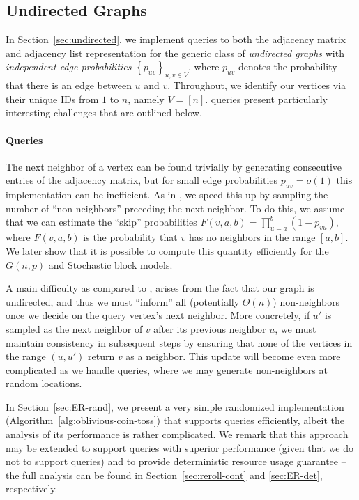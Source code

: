 \subsection{Undirected Graphs}
\label{sec:undirected_graphs}
In Section~\ref{sec:undirected}, we implement queries to both the adjacency matrix and adjacency list representation
for the generic class of \emph{undirected graphs} with {\em independent edge probabilities} $\left\{ p_{uv} \right\}_{u,v\in V}$,
where $p_{uv}$ denotes the probability that there is an edge between $u$ and $v$.
Throughout, we identify our vertices via their unique IDs from $1$ to $n$, namely $V = [n]$.
 queries present particularly interesting challenges that are outlined below.

\paragraph*{ Queries}
\label{par:next_neighbor_queries}
The next neighbor of a vertex can be found trivially by generating consecutive entries of the adjacency matrix,
but for small edge probabilities $p_{uv} = o(1)$ this implementation can be inefficient.
As in \cite{reut}, we speed this up by sampling the number of ``non-neighbors'' preceding the next neighbor.
To do this, we assume that we can estimate the ``skip'' probabilities $F(v,a,b)=\prod^{b}_{u=a} (1-p_{vu})$,
where $F(v,a,b)$ is the probability that $v$ has no neighbors in the range $[a,b]$.
We later show that it is possible to compute this quantity efficiently for the $G(n,p)$ and Stochastic block models.

A main difficulty as compared to \cite{reut}, arises from the fact that our graph is undirected,
and thus we must ``inform'' all (potentially $\Theta(n)$) non-neighbors once we decide on the query vertex's next neighbor.
More concretely, if $u'$ is sampled as the next neighbor of $v$ after its previous neighbor $u$,
we must maintain consistency in subsequent steps by ensuring that none of the vertices in the range $(u,u')$ return $v$ as a neighbor.
This update will become even more complicated as we handle  queries, where we may generate non-neighbors at random locations.

In Section~\ref{sec:ER-rand}, we present a very simple randomized implementation (Algorithm~\ref{alg:oblivious-coin-toss})
that supports  queries efficiently, albeit the analysis of its performance is rather complicated.
We remark that this approach may be extended to support  queries with superior performance
(given that we do not to support  queries) and to provide deterministic resource usage guarantee
-- the full analysis can be found in Section~\ref{sec:reroll-cont} and \ref{sec:ER-det}, respectively.


